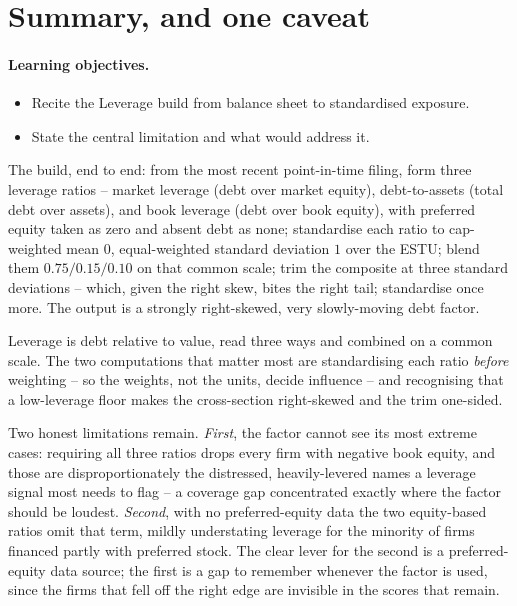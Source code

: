\documentclass[11pt]{article}
\theoremstyle{definition}
\theoremstyle{plain}
\theoremstyle{remark}
\begin{document}
\section{Summary, and one caveat}\label{sec:summary}

\paragraph{Learning objectives.}
\begin{itemize}[leftmargin=1.4em,topsep=2pt]
  \item Recite the Leverage build from balance sheet to standardised exposure.
  \item State the central limitation and what would address it.
\end{itemize}

The build, end to end: from the most recent point-in-time filing, form three leverage ratios -- market leverage (debt over market equity), debt-to-assets (total debt over assets), and book leverage (debt over book equity), with preferred equity taken as zero and absent debt as none; standardise each ratio to cap-weighted mean $0$, equal-weighted standard deviation $1$ over the ESTU; blend them $0.75/0.15/0.10$ on that common scale; trim the composite at three standard deviations -- which, given the right skew, bites the right tail; standardise once more. The output is a strongly right-skewed, very slowly-moving debt factor.

\begin{keyresult}
Leverage is debt relative to value, read three ways and combined on a common scale. The two computations that matter most are standardising each ratio \emph{before} weighting -- so the weights, not the units, decide influence -- and recognising that a low-leverage floor makes the cross-section right-skewed and the trim one-sided.
\end{keyresult}

\begin{pitfall}
Two honest limitations remain. \emph{First}, the factor cannot see its most extreme cases: requiring all three ratios drops every firm with negative book equity, and those are disproportionately the distressed, heavily-levered names a leverage signal most needs to flag -- a coverage gap concentrated exactly where the factor should be loudest. \emph{Second}, with no preferred-equity data the two equity-based ratios omit that term, mildly understating leverage for the minority of firms financed partly with preferred stock. The clear lever for the second is a preferred-equity data source; the first is a gap to remember whenever the factor is used, since the firms that fell off the right edge are invisible in the scores that remain.
\end{pitfall}
\end{document}
